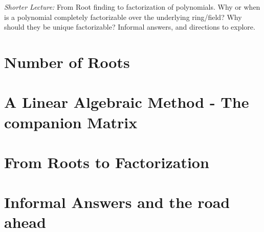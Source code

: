 
\noindent
\textit{Shorter Lecture:}
From Root finding to factorization of polynomials. Why or when is a polynomial completely factorizable over the underlying ring/field? Why should they be unique factorizable? Informal answers, and directions to explore.

\section{Number of Roots}

\section{A Linear Algebraic Method - The companion Matrix}

\section{From Roots to Factorization}

\section{Informal Answers and the road ahead}
